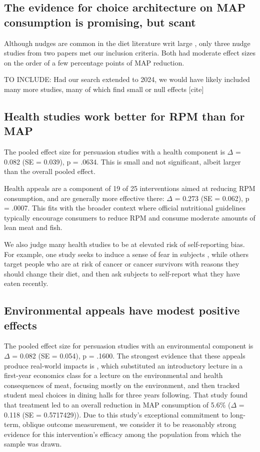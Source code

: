 \documentclass[sn-nature,pdflatex]{sn-jnl}
\begin{document}
\subsection{The evidence for choice architecture on MAP consumption is
promising, but scant}\label{sec2.5}

Although nudges are common in the diet literature writ large
\citep{olafsson2024, cadario2020, szaszi2018}, only three nudge studies
from two papers \citep[@][]{kanchanachitra2020, andersson2021} met our
inclusion criteria. Both had moderate effect sizes on the order of a few
percentage points of MAP reduction.

TO INCLUDE: Had our search extended to 2024, we would have likely
included many more studies, many of which find small or null effects
{[}cite{]}

\subsection{Health studies work better for RPM than for
MAP}\label{sec2.6}

The pooled effect size for persuasion studies with a health component is
\(\Delta\) = 0.082 (SE = 0.039), p = .0634. This is small and not
significant, albeit larger than the overall pooled effect.

Health appeals are a component of 19 of 25 interventions aimed at
reducing RPM consumption, and are generally more effective there:
\(\Delta\) = 0.273 (SE = 0.062), p = .0007. This fits with the broader
context where official nutritional guidelines typically encourage
consumers to reduce RPM and consume moderate amounts of lean meat and
fish.

We also judge many health studies to be at elevated risk of
self-reporting bias. For example, one study seeks to induce a sense of
fear in subjects \citep{berndsen2005}, while others target people who
are at risk of cancer \citep{hatami2018} or cancer survivors
\citep{james2015, lee2018} with reasons they should change their diet,
and then ask subjects to self-report what they have eaten recently.

\subsection{Environmental appeals have modest positive
effects}\label{sec2.7}

The pooled effect size for persuasion studies with an environmental
component is \(\Delta\) = 0.082 (SE = 0.054), p = .1600. The strongest
evidence that these appeals produce real-world impacts is
\citep{jalil2023}, which substituted an introductory lecture in a
first-year economics class for a lecture on the environmental and health
consequences of meat, focusing mostly on the environment, and then
tracked student meal choices in dining halls for three years following.
That study found that treatment led to an overall reduction in MAP
consumption of 5.6\% (\(\Delta\) = 0.118 (SE = 0.5717429)). Due to this
study's exceptional commitment to long-term, oblique outcome
measurement, we consider it to be reasonably strong evidence for this
intervention's efficacy among the population from which the sample was
drawn.
\end{document}

